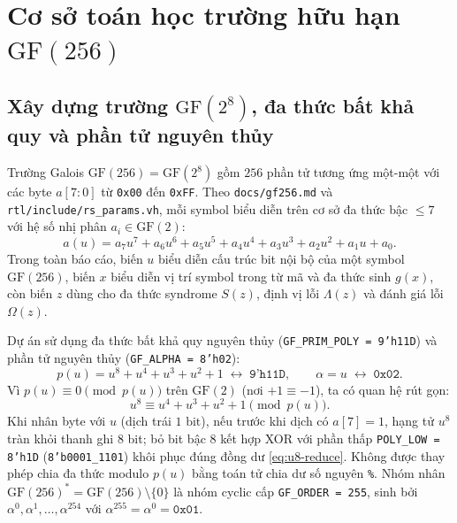 \documentclass[11pt,a4paper]{report}
\begin{document}
\section{Cơ sở toán học trường hữu hạn \texorpdfstring{$\text{GF}(256)$}{GF(256)}}

\subsection{Xây dựng trường \texorpdfstring{$\text{GF}(2^8)$}{GF(2\textasciicircum 8)}, đa thức bất khả quy và phần tử nguyên thủy}

Trường Galois $\text{GF}(256) = \text{GF}(2^8)$ gồm $256$ phần tử tương ứng một-một với các byte $a[7:0]$ từ \texttt{0x00} đến \texttt{0xFF}. Theo \texttt{docs/gf256.md} và \texttt{rtl/include/rs\_params.vh}, mỗi symbol biểu diễn trên cơ sở đa thức bậc $\le 7$ với hệ số nhị phân $a_i \in \text{GF}(2)$:
\begin{equation}
    a(u) = a_7 u^7 + a_6 u^6 + a_5 u^5 + a_4 u^4 + a_3 u^3 + a_2 u^2 + a_1 u + a_0.
    \label{eq:gf-poly-basis}
\end{equation}
Trong toàn báo cáo, biến $u$ biểu diễn cấu trúc bit nội bộ của một symbol $\text{GF}(256)$, biến $x$ biểu diễn vị trí symbol trong từ mã và đa thức sinh $g(x)$, còn biến $z$ dùng cho đa thức syndrome $S(z)$, định vị lỗi $\Lambda(z)$ và đánh giá lỗi $\Omega(z)$.

Dự án sử dụng đa thức bất khả quy nguyên thủy (\texttt{GF\_PRIM\_POLY = 9'h11D}) và phần tử nguyên thủy (\texttt{GF\_ALPHA = 8'h02}):
\begin{equation}
    p(u) = u^8 + u^4 + u^3 + u^2 + 1 \;\longleftrightarrow\; \texttt{9'h11D}, \qquad \alpha = u \;\longleftrightarrow\; \texttt{0x02}.
    \label{eq:prim-poly}
\end{equation}
Vì $p(u) \equiv 0 \pmod{p(u)}$ trên $\text{GF}(2)$ (nơi $+1 \equiv -1$), ta có quan hệ rút gọn:
\begin{equation}
    u^8 \equiv u^4 + u^3 + u^2 + 1 \pmod{p(u)}.
    \label{eq:u8-reduce}
\end{equation}
Khi nhân byte với $u$ (dịch trái $1\text{ bit}$), nếu trước khi dịch có $a[7] = 1$, hạng tử $u^8$ tràn khỏi thanh ghi 8 bit; bỏ bit bậc 8 kết hợp XOR với phần thấp \texttt{POLY\_LOW = 8'h1D} (\texttt{8'b0001\_1101}) khôi phục đúng đồng dư \eqref{eq:u8-reduce}. Không được thay phép chia đa thức modulo $p(u)$ bằng toán tử chia dư số nguyên \texttt{\%}. Nhóm nhân $\text{GF}(256)^* = \text{GF}(256) \setminus \{0\}$ là nhóm cyclic cấp \texttt{GF\_ORDER = 255}, sinh bởi $\alpha^0, \alpha^1, \dots, \alpha^{254}$ với $\alpha^{255} = \alpha^0 = \texttt{0x01}$.
\end{document}
